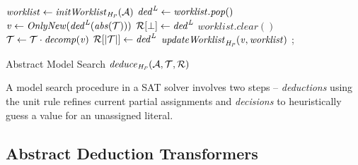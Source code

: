 \begin{algorithm2e}[t]
\DontPrintSemicolon
{}
\begin{small}
$\mathit{worklist} \leftarrow \mathit{initWorklist}_{\mathit{H_P}}(\mathcal{A})$ \;
{
  $\mathit{ded}^{\mathit{L}} \leftarrow \mathit{worklist.pop}()$ \; 
  $\mathit{v} \leftarrow \mathit{OnlyNew}(\mathit{ded}^{\mathit{L}}(\mathit{abs}(\mathcal{T})))$\;
  \uIf{$\newdeductions = \bot$} {
    $\mathcal{R}[\bot] \leftarrow \mathit{ded}^{\mathit{L}}$ \;
    $\mathit{worklist.clear}()$ \;
    \return \conflict \;
  }
  \uElse
  {
    $\mathcal{T} \leftarrow \mathcal{T} \cdot {\mathit{decomp}}(\mathit{v})$ \; 
    $\mathcal{R}[|\mathcal{T}|] \leftarrow \mathit{ded}^{\mathit{L}}$ \;
    $\mathit{updateWorklist}_{\mathit{H_P}}(\mathit{v}, \mathit{worklist})$ \; 
  }
}
 {
  \return \sat;
}
 \return \unknown \;

\end{small}
\caption{Abstract Model Search $\mathit{deduce}_{\mathit{H_P}}(\mathcal{A},\mathcal{T},\mathcal{R})$ \label{Alg:ms}}
\end{algorithm2e}
%  
A model search procedure in a SAT solver involves two steps -- {\em deductions} 
using the unit rule refines current partial assignments and 
{\em decisions} to heuristically guess a value for an unassigned 
literal.  
%

\subsection{Abstract Deduction Transformers} \label{sec:abst}

